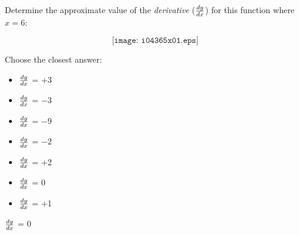 

Determine the approximate value of the {\it derivative} ($dy \over dx$) for this function where $x=6$:

$$\texttt{[image: i04365x01.eps]}$$

Choose the closest answer:

\begin{itemize}
\item{} $dy \over dx$ = +3
\vskip 10pt 
\item{} $dy \over dx$ = $-3$
\vskip 10pt 
\item{} $dy \over dx$ = $-9$
\vskip 10pt 
\item{} $dy \over dx$ = $-2$
\vskip 10pt 
\item{} $dy \over dx$ = +2
\vskip 10pt 
\item{} $dy \over dx$ = 0
\vskip 10pt 
\item{} $dy \over dx$ = +1
\end{itemize}







$dy \over dx$ = 0











